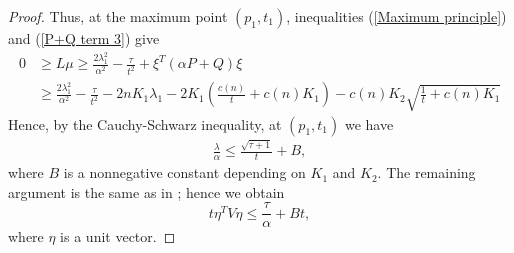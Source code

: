 \documentclass{amsart}
\theoremstyle{definition}
\theoremstyle{remark}
\numberwithin{equation}{section}
\begin{document}
\begin{proof}
Thus, at the maximum point $(p_{1},t_{1})$, inequalities (\ref{Maximum principle}) and (\ref{P+Q term 3}) give 
\begin{align*}
0&\geq L\mu\geq \frac{2\lambda_{1}^{2}}{\alpha^{2}}-\frac{\tau}{t^{2}}+\xi^{T}(\alpha P+Q)\xi\\
&\geq  \frac{2\lambda_{1}^{2}}{\alpha^{2}}-\frac{\tau}{t^{2}}-2nK_{1}\lambda_{1}-2K_{1}(\frac{c(n)}{t}+c(n)K_{1})-c(n)K_{2}\sqrt{\frac{1}{t}+c(n)K_{1}}
\end{align*}
Hence, by the Cauchy-Schwarz inequality, at $(p_{1},t_{1})$ we have 
\begin{align*}
\frac{\lambda}{\alpha}\leq \frac{\sqrt{\tau+1}}{t}+B,
\end{align*}
where $B$ is a nonnegative constant depending on $K_{1}$ and $K_{2}$.
The remaining argument is the same as in \cite{Han-Zhang}; hence we obtain 
$$
t\eta^{T}V\eta\leq \frac{\tau}{\alpha}+Bt,
$$ 
where $\eta$ is a unit vector. 
\end{proof}
\end{document}
